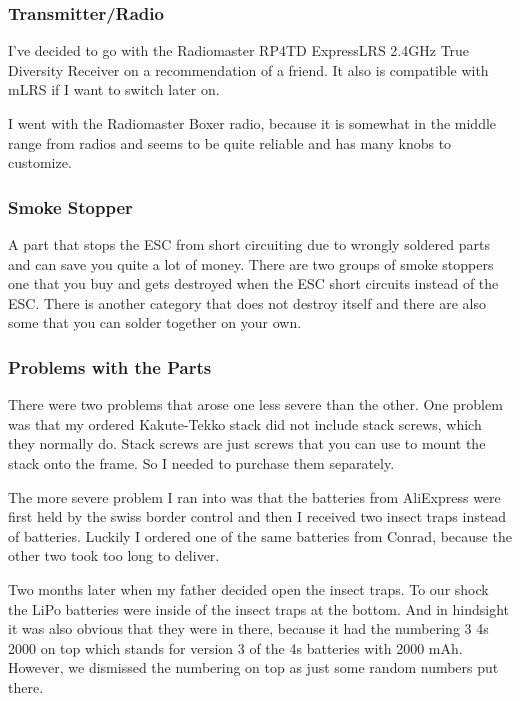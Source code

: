 \documentclass{article}
\begin{document}
	\subsubsection*{Transmitter/Radio}
	I've decided to go with the Radiomaster RP4TD ExpressLRS 2.4GHz True Diversity Receiver\cite{radiomasterreceiver} on a recommendation of a friend. It also is compatible with mLRS if I want to switch later on.
	
	I went with the Radiomaster Boxer\cite{radiomasterboxer} radio, because it is somewhat in the middle range from radios and seems to be quite reliable and has many knobs to customize. 

	\subsubsection{Smoke Stopper}
	A part that stops the ESC from short circuiting due to wrongly soldered parts and can save you quite a lot of money. There are two groups of smoke stoppers one that you buy and gets destroyed when the ESC short circuits instead of the ESC. There is another category that does not destroy itself and there are also some that you can solder together on your own\cite{smokestopper}. 
	
	\subsubsection{Problems with the Parts}

	There were two problems that arose one less severe than the other. One problem was that my ordered Kakute-Tekko stack did not include stack screws, which they normally do. Stack screws are just screws that you can use to mount the stack onto the frame. So I needed to purchase them separately.
	
	The more severe problem I ran into was that the batteries from AliExpress were first held by the swiss border control and then I received two insect traps instead of batteries. Luckily I ordered one of the same batteries from Conrad, because the other two took too long to deliver.
	
	Two months later when my father decided open the insect traps. To our shock the LiPo batteries were inside of the insect traps at the bottom. And in hindsight it was also obvious that they were in there, because it had the numbering 3 4s 2000 on top which stands for version 3 of the 4s batteries with 2000 mAh. However, we dismissed the numbering on top as just some random numbers put there. 
	
\end{document}
